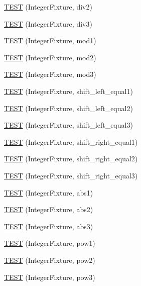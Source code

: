 \begin{DoxyCompactItemize}
\item 
\hyperlink{_test_integer_8c_09_09_ad51a92e11e604831df276045d3302c82}{T\-E\-S\-T} (Integer\-Fixture, div2)
\item 
\hyperlink{_test_integer_8c_09_09_a3d8823c1928745620c842c34fd753c9f}{T\-E\-S\-T} (Integer\-Fixture, div3)
\item 
\hyperlink{_test_integer_8c_09_09_a5a3e5e2da8ceac800cf98ccc31190fb3}{T\-E\-S\-T} (Integer\-Fixture, mod1)
\item 
\hyperlink{_test_integer_8c_09_09_af8da24ec2c1997a271cf2132d137fa5d}{T\-E\-S\-T} (Integer\-Fixture, mod2)
\item 
\hyperlink{_test_integer_8c_09_09_a2b100215b05edf640337b4808eef0447}{T\-E\-S\-T} (Integer\-Fixture, mod3)
\item 
\hyperlink{_test_integer_8c_09_09_ac61631f702c7ea22e5bd4fa98969e9ea}{T\-E\-S\-T} (Integer\-Fixture, shift\-\_\-left\-\_\-equal1)
\item 
\hyperlink{_test_integer_8c_09_09_a5fa62bd8086b90cd8f34c9b8c323f1e6}{T\-E\-S\-T} (Integer\-Fixture, shift\-\_\-left\-\_\-equal2)
\item 
\hyperlink{_test_integer_8c_09_09_a0ac3a659eb01bc27e764ec6832d53c62}{T\-E\-S\-T} (Integer\-Fixture, shift\-\_\-left\-\_\-equal3)
\item 
\hyperlink{_test_integer_8c_09_09_a37ed42e0089ee636a2c8ce9fa3b2f65f}{T\-E\-S\-T} (Integer\-Fixture, shift\-\_\-right\-\_\-equal1)
\item 
\hyperlink{_test_integer_8c_09_09_a1ce22a70294a53e2d85b7f113710d95e}{T\-E\-S\-T} (Integer\-Fixture, shift\-\_\-right\-\_\-equal2)
\item 
\hyperlink{_test_integer_8c_09_09_aa129a03b21d6e2c23e7bf3cf254edeff}{T\-E\-S\-T} (Integer\-Fixture, shift\-\_\-right\-\_\-equal3)
\item 
\hyperlink{_test_integer_8c_09_09_a17d2e19e3ee00f0ed7155677e1b154a6}{T\-E\-S\-T} (Integer\-Fixture, abs1)
\item 
\hyperlink{_test_integer_8c_09_09_a7504320f0b9dd100aec4822556a0598a}{T\-E\-S\-T} (Integer\-Fixture, abs2)
\item 
\hyperlink{_test_integer_8c_09_09_ae4016846ce98202c9b9bb37d2c139028}{T\-E\-S\-T} (Integer\-Fixture, abs3)
\item 
\hyperlink{_test_integer_8c_09_09_ac1f98278a1a88743082f3a97e5180a2e}{T\-E\-S\-T} (Integer\-Fixture, pow1)
\item 
\hyperlink{_test_integer_8c_09_09_ac2880cab72f5b9dd22bba9b7dc6c7c4b}{T\-E\-S\-T} (Integer\-Fixture, pow2)
\item 
\hyperlink{_test_integer_8c_09_09_a3bf1a95e5c364f3cf8dd3a2ebbf4a455}{T\-E\-S\-T} (Integer\-Fixture, pow3)
\end{DoxyCompactItemize}


